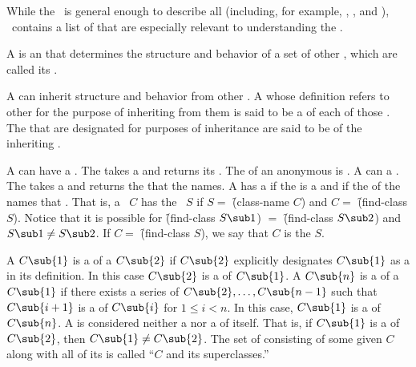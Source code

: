 
While the \CLOS\ is general enough to describe all  
(including, for example, , , and
), \thenextfigure\ contains a list of  that are
especially relevant to understanding the \CLOS.



A  is an  that determines the structure and behavior 
of a set of other , which are called its .   

A  can inherit structure and behavior from other .
A  whose definition refers to other  for the purpose 
of inheriting from them is said to be a  of each of
those . The  that are designated for purposes of
inheritance are said to be  of the inheriting .
                                              
A  can have a . The   
takes a   and returns its . 
The  of an anonymous  is \nil.  A  
can  a . The   takes a
 and returns the  that the  names.
A  has a  if the  is a 
and if the  of the  names that .
That is, a ~$C$ has the ~$S$ if $S=$
\f{(class-name $C$)} and $C=$ \f{(find-class $S$)}.
Notice that it is possible for 
\f{(find-class $S\sub 1$)} $=$ \f{(find-class $S\sub 2$)}
and $S\sub 1\neq S\sub 2$.
If $C=$ \f{(find-class $S$)}, we say that $C$ is the   $S$.

A  $C\sub{1}$ is 
a  of a  $C\sub{2}$
if $C\sub{2}$ explicitly designates $C\sub{1}$ 
as a  in its definition.
In this case $C\sub{2}$ is a  of $C\sub{1}$.
A  $C\sub{n}$ is a  of 
a  $C\sub{1}$ if there exists a series of
 $C\sub{2},\ldots,C\sub{n-1}$ such that 
$C\sub{i+1}$ is a  of $C\sub{i}$ for $1 \leq i<n$.
In this case, $C\sub{1}$ is a  of $C\sub{n}$.
A  is considered neither a  nor a  of itself.
That is, if $C\sub{1}$ is a  of $C\sub{2}$, 
then $C\sub{1} \neq C\sub{2}$.
The set of  consisting of some given  $C$ 
along with all of its  is called ``$C$ and its superclasses.''

